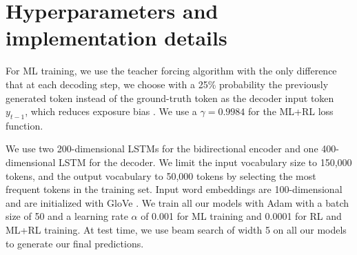 \documentclass{article} \usepackage{iclr2018_arxiv,times}
\begin{document}
\section{Hyperparameters and implementation details}

For ML training, we use the teacher forcing algorithm with the only difference that at each decoding step, we choose with a 25\% probability the previously generated token instead of the ground-truth token as the decoder input token $y_{t-1}$, which reduces exposure bias \citep{venkatraman2015}. We use a $\gamma = 0.9984$ for the ML+RL loss function.

We use two 200-dimensional LSTMs for the bidirectional encoder and one 400-dimensional LSTM for the decoder. We limit the input vocabulary size to 150,000 tokens, and the output vocabulary to 50,000 tokens by selecting the most frequent tokens in the training set. Input word embeddings are 100-dimensional and are initialized with GloVe \citep{pennington2014}. We train all our models with Adam \citep{kingma2014} with a batch size of 50 and a learning rate $\alpha$ of 0.001 for ML training and 0.0001 for RL and ML+RL training. At test time, we use beam search of width 5 on all our models to generate our final predictions.
\end{document}
